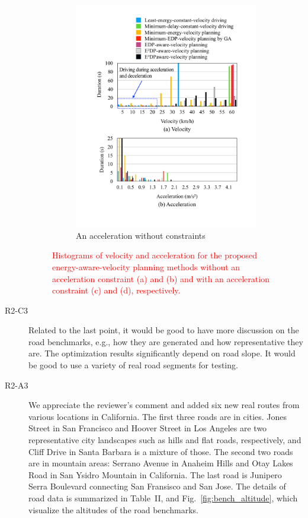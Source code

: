\documentclass[onecolumn]{IEEEconf}
\begin{document}
\begin{description}
\begin{figure}[h!]
\begin{subfigure}{0.45\textwidth}
	\includegraphics[width=\hsize]{Figures/Histogram_acc.pdf}
	\caption{An acceleration without constraints}
	\label{fig:histogram_acc}
	\end{subfigure}
\caption{\textcolor{red}{Histograms of velocity and acceleration for the proposed energy-aware-velocity planning methods without an acceleration constraint (a) and (b) and with an acceleration constraint (c) and (d), respectively.}}
\label{fig:histogram}
\end{figure}

\item [R2-C3] Related to the last point, it would be good to have more discussion on the road benchmarks, e.g., how they are generated and how representative they are. The optimization results significantly depend on road slope. It would be good to use a variety of real road segments for testing.

\item [R2-A3] We appreciate the reviewer's comment and added six new real routes from various locations in California.  The first three roads are in cities. Jones Street in San Francisco and Hoover Street in Los Angeles are two representative city landscapes such as hills and flat roads, respectively, and Cliff Drive in Santa Barbara is a mixture of those. The second two roads are in mountain areas: Serrano Avenue in Anaheim Hills and Otay Lakes Road in San Ysidro Mountain in California. The last road is Junipero Serra Boulevard connecting San Fransisco and San Jose. The details of road data is summarized in Table~II, and Fig.~\ref{fig:bench_altitude}, which visualize the altitudes of the road benchmarks.


\end{description}
\end{document}
